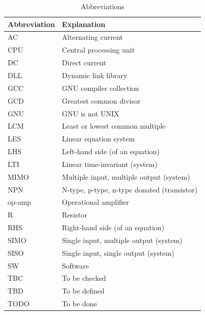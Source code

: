 \begin{table}[h]
\begin{center}
\begin{tabular}{|l|l|}

\hline
Abbreviation & Explanation \\ \hline

AC      & Alternating current                                  \\
CPU     & Central processing unit                              \\
DC      & Direct current                                       \\
DLL     & Dynamic link library                                 \\
GCC     & GNU compiler collection                              \\
GCD     & Greatest common divisor                              \\
GNU     & GNU is not UNIX                                      \\
LCM     & Least or lowest common multiple                      \\
LES     & Linear equation system                               \\
LHS     & Left-hand side (of an equation)                      \\
LTI     & Linear time-invariant (system)                       \\
MIMO    & Multiple input, multiple output (system)             \\
NPN     & N-type, p-type, n-type donated (transistor)          \\
op-amp  & Operational amplifier                                \\
R       & Resistor                                             \\
RHS     & Right-hand side (of an equation)                     \\
SIMO    & Single input, multiple output (system)               \\
SISO    & Single input, single output (system)                 \\
SW      & Software                                             \\
TBC     & To be checked                                        \\
TBD     & To be defined                                        \\
TODO    & To be done                                           \\
\hline

\end{tabular}
\caption{Abbreviations}
\label{tabAbbrev}
\end{center}
\end{table}
